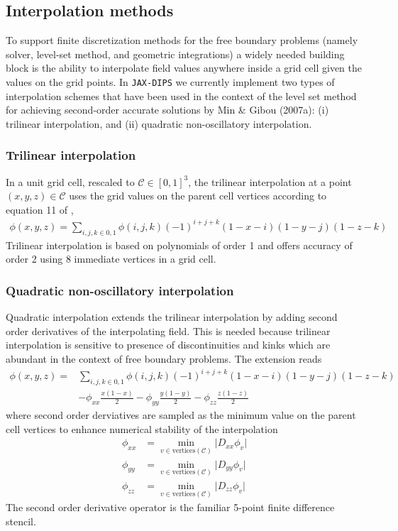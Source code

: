 \documentclass{elsarticle}
\begin{document}
\subsection{Interpolation methods}
To support finite discretization methods for the free boundary problems (namely solver, level-set method, and geometric integrations) a widely needed building block is the ability to interpolate field values anywhere inside a grid cell given the values on the grid points. In \texttt{JAX-DIPS} we currently implement two types of interpolation schemes that have been used in the context of the level set method for achieving second-order accurate solutions by Min \& Gibou (2007a)\cite{MIN2007300}: (i) trilinear interpolation, and (ii) quadratic non-oscillatory interpolation.


\subsubsection{Trilinear interpolation}
In a unit grid cell, rescaled to $\mathcal{C}\in [0,1]^3$, the trilinear interpolation at a point $(x,y,z)\in \mathcal{C}$ uses the grid values on the parent cell vertices according to equation 11 of \cite{MIN2007300},
\begin{align*}
 \phi(x,y,z)= \sum_{i,j,k\in {0,1}} \phi(i,j,k) (-1)^{i+j+k}(1-x-i)(1-y-j)(1-z-k)
\end{align*}
Trilinear interpolation is based on polynomials of order 1 and offers accuracy of order 2 using 8 immediate vertices in a grid cell.

\subsubsection{Quadratic non-oscillatory interpolation}
Quadratic interpolation extends the trilinear interpolation by adding second order derivatives of the interpolating field. This is needed because trilinear interpolation is sensitive to presence of discontinuities and kinks which are abundant in the context of free boundary problems. The extension reads
\begin{align*}
	\phi(x,y,z)= &\sum_{i,j,k\in {0,1}} \phi(i,j,k) (-1)^{i+j+k}(1-x-i)(1-y-j)(1-z-k) \\
				& - \phi_{xx} \frac{x(1-x)}{2} - \phi_{yy} \frac{y(1-y)}{2}- \phi_{zz} \frac{z(1-z)}{2} 
\end{align*}
where second order derviatives are sampled as the minimum value on the parent cell vertices to enhance numerical stability of the interpolation
\begin{align*}
	\phi_{xx} & = \min_{v \in \textrm{vertices}(\mathcal{C})} \vert D_{xx} \phi_v \vert \\
	\phi_{yy} & = \min_{v \in \textrm{vertices}(\mathcal{C})} \vert D_{yy} \phi_v \vert \\
	\phi_{zz} & = \min_{v \in \textrm{vertices}(\mathcal{C})} \vert D_{zz} \phi_v \vert
\end{align*}
The second order derivative operator is the familiar 5-point finite difference stencil.
\end{document}
